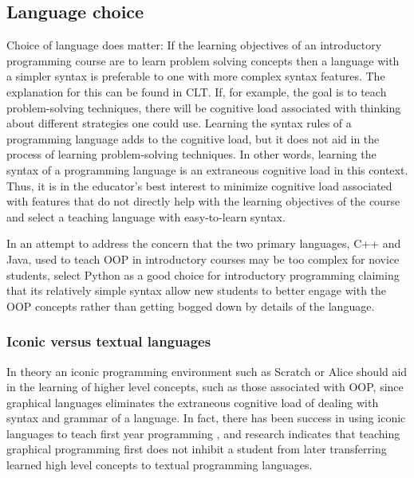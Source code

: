 \documentclass[12pt]{article}
\begin{document}
\subsection*{Language choice}
Choice of language does matter: If the learning objectives of an
introductory programming course are to learn problem solving concepts
then a language with a simpler syntax is preferable to one with more
complex syntax features\autocite{koulouri_teaching_2014}. The
explanation for this can be found in CLT. If, for example, the goal is
to teach problem-solving techniques, there will be cognitive load
associated with thinking about different strategies one could
use. Learning the syntax rules of a programming language adds to the
cognitive load, but it does not aid in the process of learning
problem-solving techniques. In other words, learning the syntax of a
programming language is an extraneous cognitive load in this
context. Thus, it is in the educator's best interest to minimize
cognitive load associated with features that do not directly help with
the learning objectives of the course and select a teaching language
with easy-to-learn syntax.

In an attempt to address the concern that the two primary languages,
C++ and Java, used to teach OOP in introductory courses may be too
complex for novice students, \citeauthor{goldwasser_teaching_2008}
select Python as a good choice for introductory programming claiming
that its relatively simple syntax allow new students to better engage
with the OOP concepts rather than getting bogged down by details of
the language\autocite{goldwasser_teaching_2008}.

\subsubsection*{Iconic versus textual languages}

In theory an iconic programming environment such as
Scratch\autocite{resnick_scratch_2009} or
Alice\autocite{cooper_using_2003} should aid in the learning of higher
level concepts, such as those associated with OOP, since graphical
languages eliminates the extraneous cognitive load of dealing with
syntax and grammar of a language. In fact, there has been success in
using iconic languages to teach first year programming
\autocite{calloni_iconic_1997}, and research indicates that teaching
graphical programming first does not inhibit a student from later
transferring learned high level concepts to textual programming
languages\autocite{hundhausen_can_2009}.
\end{document}
